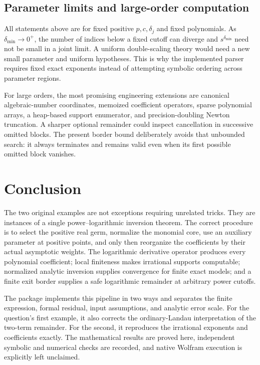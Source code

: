 \documentclass[11pt,a4paper]{article}
\numberwithin{equation}{section}
\theoremstyle{definition}
\begin{document}
\subsection{Parameter limits and large-order computation}
All statements above are for fixed positive $p,c,\delta_j$ and fixed
polynomials. As $\delta_{\min}\to0^+$, the number of indices below a
fixed cutoff can diverge and $s^{\delta_{\min}}$ need not be small in a
joint limit. A uniform double-scaling theory would need a new small
parameter and uniform hypotheses. This is why the implemented parser
requires fixed exact exponents instead of attempting symbolic ordering
across parameter regions.

For large orders, the most promising engineering extensions are canonical
algebraic-number coordinates, memoized coefficient operators, sparse
polynomial arrays, a heap-based support enumerator, and precision-doubling
Newton truncation. A sharper optional remainder could inspect cancellation
in successive omitted blocks. The present border bound deliberately
avoids that unbounded search: it always terminates and remains valid even
when its first possible omitted block vanishes.

\section{Conclusion}

The two original examples are not exceptions requiring unrelated tricks.
They are instances of a single power--logarithmic inversion theorem.
The correct procedure is to select the positive real germ, normalize the
monomial core, use an auxiliary parameter at positive points, and only
then reorganize the coefficients by their actual asymptotic weights.
The logarithmic derivative operator produces every polynomial coefficient;
local finiteness makes irrational supports computable; normalized
analytic inversion supplies convergence for finite exact models; and a
finite exit border supplies a safe logarithmic remainder at arbitrary
power cutoffs.

The package implements this pipeline in two ways and separates the finite
expression, formal residual, input assumptions, and analytic error scale.
For the question's first example, it also corrects the ordinary-Landau
interpretation of the two-term remainder. For the second, it reproduces
the irrational exponents and coefficients exactly. The mathematical
results are proved here, independent symbolic and numerical checks are
recorded, and native Wolfram execution is explicitly left unclaimed.
\end{document}
